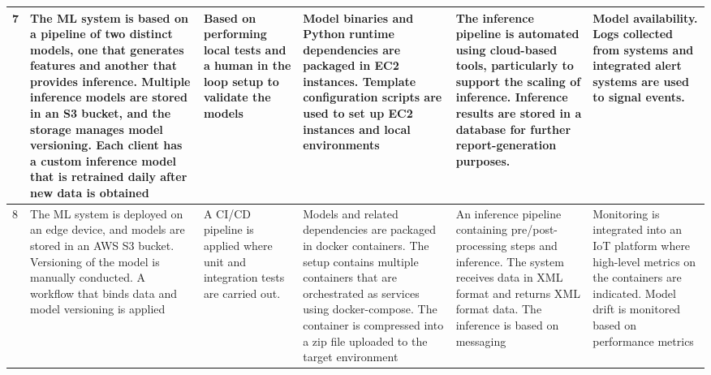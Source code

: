 \begin{table*}[ht!]
\begin{tabular}{p{0.6cm}p{3.2cm}p{2.5cm}p{3.2cm}p{3cm}p{3cm}}
    7 & The ML system is based on a pipeline of two distinct models, one that generates features and another that provides inference. Multiple inference models are stored in an S3 bucket, and the storage manages model versioning. Each client has a custom inference model that is retrained daily after new data is obtained & Based on performing local tests and a human in the loop setup to validate the models & Model binaries and Python runtime dependencies are packaged in EC2 instances. Template configuration scripts are used to set up EC2 instances and local environments & The inference pipeline is automated using cloud-based tools, particularly to support the scaling of inference. Inference results are stored in a database for further report-generation purposes. & Model availability. Logs collected from systems and integrated alert systems are used to signal events. \\
    \midrule[0.01pt]

    8 & The ML system is deployed on an edge device, and models are stored in an AWS S3 bucket. Versioning of the model is manually conducted. A workflow that binds data and model versioning is applied & A CI/CD pipeline is applied where unit and integration tests are carried out. & Models and related dependencies are packaged in docker containers. The setup contains multiple containers that are orchestrated as services using docker-compose. The container is compressed into a zip file uploaded to the target environment & An inference pipeline containing pre/post-processing steps and inference. The system receives data in XML format and returns XML format data. The inference is based on messaging & Monitoring is integrated into an IoT platform where high-level metrics on the containers are indicated. Model drift is monitored based on performance metrics \\
    \hline
    \end{tabular}
    \label{tab: summary of cases}
\end{table*}
